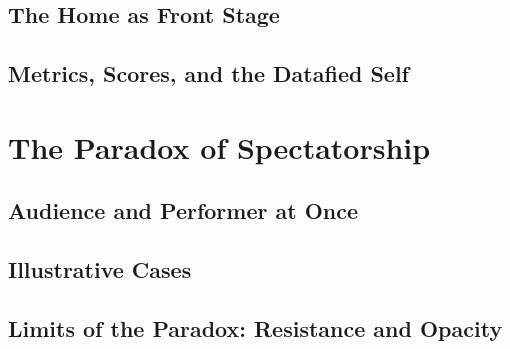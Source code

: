 \documentclass[11pt]{article}
\begin{document}
\subsection{The Home as Front Stage}

\subsection{Metrics, Scores, and the Datafied Self}

\section{The Paradox of Spectatorship}
\label{sec:paradox}

\subsection{Audience and Performer at Once}

\subsection{Illustrative Cases}

\subsection{Limits of the Paradox: Resistance and Opacity}
\end{document}
